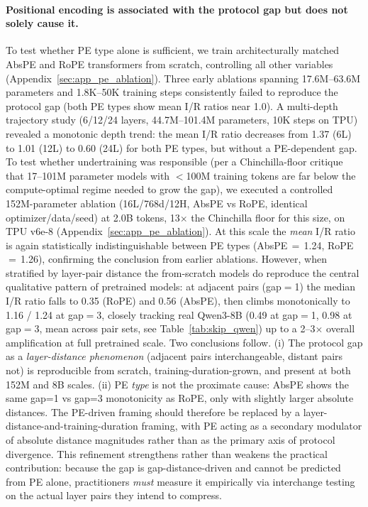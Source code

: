\documentclass{article}
\begin{document}
\paragraph{Positional encoding is associated with the protocol gap but does not solely cause it.}
To test whether PE type alone is sufficient, we train architecturally matched AbsPE and RoPE transformers from scratch, controlling all other variables (Appendix~\ref{sec:app_pe_ablation}). Three early ablations spanning 17.6M--63.6M parameters and 1.8K--50K training steps consistently failed to reproduce the protocol gap (both PE types show mean I/R ratios near 1.0). A multi-depth trajectory study (6/12/24 layers, 44.7M--101.4M parameters, 10K steps on TPU) revealed a monotonic depth trend: the mean I/R ratio decreases from 1.37 (6L) to 1.01 (12L) to 0.60 (24L) for both PE types, but without a PE-dependent gap. To test whether undertraining was responsible (per a Chinchilla-floor critique that 17--101M parameter models with $<$100M training tokens are far below the compute-optimal regime needed to grow the gap), we executed a controlled 152M-parameter ablation (16L/768d/12H, AbsPE vs RoPE, identical optimizer/data/seed) at 2.0B tokens, 13$\times$ the Chinchilla floor for this size, on TPU v6e-8 (Appendix~\ref{sec:app_pe_ablation}). At this scale the \emph{mean} I/R ratio is again statistically indistinguishable between PE types (AbsPE\,$=$\,1.24, RoPE\,$=$\,1.26), confirming the conclusion from earlier ablations. However, when stratified by layer-pair distance the from-scratch models do reproduce the central qualitative pattern of pretrained models: at adjacent pairs (gap$=$1) the median I/R ratio falls to 0.35 (RoPE) and 0.56 (AbsPE), then climbs monotonically to 1.16 / 1.24 at gap$=$3, closely tracking real Qwen3-8B (0.49 at gap$=$1, 0.98 at gap$=$3, mean across pair sets, see Table~\ref{tab:skip_qwen}) up to a 2--3$\times$ overall amplification at full pretrained scale. Two conclusions follow. (i) The protocol gap as a \emph{layer-distance phenomenon} (adjacent pairs interchangeable, distant pairs not) is reproducible from scratch, training-duration-grown, and present at both 152M and 8B scales. (ii) PE \emph{type} is not the proximate cause: AbsPE shows the same gap=1 vs gap=3 monotonicity as RoPE, only with slightly larger absolute distances. The PE-driven framing should therefore be replaced by a layer-distance-and-training-duration framing, with PE acting as a secondary modulator of absolute distance magnitudes rather than as the primary axis of protocol divergence. This refinement strengthens rather than weakens the practical contribution: because the gap is gap-distance-driven and cannot be predicted from PE alone, practitioners \emph{must} measure it empirically via interchange testing on the actual layer pairs they intend to compress.
\end{document}
